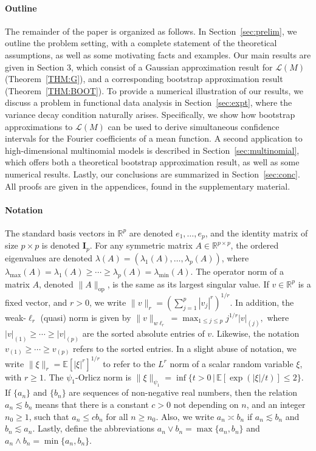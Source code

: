 \documentclass[aos,preprint]{imsart}
\numberwithin{equation}{section}
\theoremstyle{plain}
\newcommand{\R}{\mathbb{R}}
\newcommand{\E}{\mathbb{E}}
\renewcommand{\L}{\mathcal{L}}
\newcommand{\1}{{\bf{1}}}
\newcommand{\0}{\mathbf{0}}
\begin{document}
\paragraph{Outline} 
The remainder of the paper is organized as follows. In Section~\ref{sec:prelim}, we outline the problem setting, with a complete statement of the theoretical assumptions, as well as some motivating facts and examples. Our main results are given in Section 3, which consist of a Gaussian approximation result for $\L(M)$ (Theorem~\ref{THM:G}), and a corresponding bootstrap approximation result (Theorem~\ref{THM:BOOT}). To provide a numerical illustration of our results, we discuss  a problem in functional data analysis in Section~\ref{sec:expt},  where the variance decay condition naturally arises. Specifically, we show how bootstrap approximations to $\L(M)$ can be used to derive simultaneous confidence intervals for the Fourier coefficients of a mean function. A second application to high-dimensional multinomial models is described in Section~\ref{sec:multinomial}, which offers both a theoretical bootstrap approximation result, as well as some numerical results.
  Lastly, our conclusions are summarized in Section~\ref{sec:conc}. All proofs are given in the appendices, found in the supplementary material.

\paragraph{Notation} 
 The standard basis vectors in $\R^p$ are denoted $e_1,\dots,e_p$, and the identity matrix of size $p\times p$ is denoted  $\mathbf{I}_p$. For any symmetric matrix $A\in\R^{p\times p}$, the ordered eigenvalues are denoted $\lambda(A)=(\lambda_1(A),\dots,\lambda_p(A))$, where $\lambda_{\max}(A)=\lambda_1(A)\geq \cdots \geq \lambda_p(A)=\lambda_{\min}(A)$. The operator norm of a matrix $A$, denoted $\|A\|_{\text{op}}$, is the same as its largest singular value.
If $v\in\R^p$ is a fixed vector, and $r>0$, we write $\|v\|_r=(\sum_{j=1}^p |v_j|^r)^{1/r}$. In addition, the weak-$\ell_r$ (quasi) norm is given by $\|v\|_{w\ell_r}=\max_{1\leq j\leq p} j^{1/r}|v|_{(j)},$ where \mbox{$|v|_{(1)}\geq \cdots \geq |v|_{(p)}$} are the sorted absolute entries of $v$. Likewise, the notation $v_{(1)}\geq\cdots\geq v_{(p)}$ refers to the sorted entries.
In  a slight abuse of notation, we write $\|\xi\|_r=\E[|\xi|^r]^{1/r}$ to refer to the $L^r$ norm of a scalar random variable $\xi$, with $r\geq 1$. The $\psi_1$-Orlicz norm is $\|\xi\|_{\psi_1}=\inf\{t>0\, | \, \E[\exp(|\xi|/t)]\leq 2\}$.  If $\{a_n\}$ and $\{b_n\}$ are sequences of non-negative real numbers, then the relation $a_n\lesssim b_n$ means that there is a constant $c>0$ not depending on $n$, and an integer $n_0\geq 1$, such that $a_n\leq c b_n$ for all $n\geq n_0$.  Also, we write $a_n\asymp b_n$ if $a_n\lesssim b_n$ and $b_n\lesssim a_n$.
Lastly, define the abbreviations $a_n\vee b_n=\max\{a_n,b_n\}$ and $a_n\wedge b_n=\min\{a_n,b_n\}$. 
\end{document}
